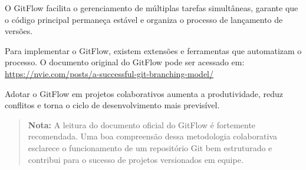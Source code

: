 O GitFlow facilita o gerenciamento de múltiplas tarefas simultâneas, garante que o código principal permaneça estável e organiza o processo de lançamento de versões.

Para implementar o GitFlow, existem extensões e ferramentas que automatizam o processo. O documento original do GitFlow pode ser acessado em: \url{https://nvie.com/posts/a-successful-git-branching-model/}

Adotar o GitFlow em projetos colaborativos aumenta a produtividade, reduz conflitos e torna o ciclo de desenvolvimento mais previsível.


\begin{quote}
\textbf{Nota:}
A leitura do documento oficial do GitFlow é fortemente recomendada. Uma boa compreensão dessa metodologia colaborativa esclarece o funcionamento de um repositório Git bem estruturado e contribui para o sucesso de projetos versionados em equipe.
\end{quote}

